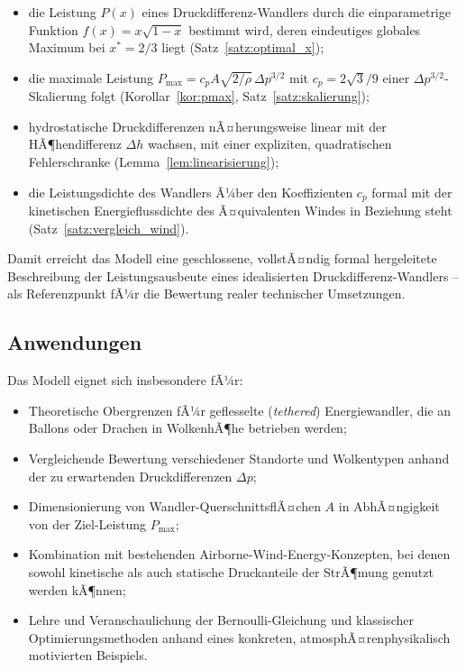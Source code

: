 ﻿\documentclass[a4paper,12pt]{article}
\theoremstyle{definition}
\begin{document}
\begin{itemize}
	\item die Leistung $P(x)$ eines Druckdifferenz-Wandlers durch die
	einparametrige Funktion $f(x) = x\sqrt{1-x}$ bestimmt wird, deren
	eindeutiges globales Maximum bei $x^\ast = 2/3$ liegt
	(Satz~\ref{satz:optimal_x});
	\item die maximale Leistung $P_{\max} = c_p A\sqrt{2/\rho}\,
	\Delta p^{3/2}$ mit $c_p = 2\sqrt{3}/9$ einer
	$\Delta p^{3/2}$-Skalierung folgt (Korollar~\ref{kor:pmax},
	Satz~\ref{satz:skalierung});
	\item hydrostatische Druckdifferenzen nÃ¤herungsweise linear mit der
	HÃ¶hendifferenz $\Delta h$ wachsen, mit einer expliziten,
	quadratischen Fehlerschranke (Lemma~\ref{lem:linearisierung});
	\item die Leistungsdichte des Wandlers Ã¼ber den Koeffizienten $c_p$
	formal mit der kinetischen Energieflussdichte des Ã¤quivalenten
	Windes in Beziehung steht (Satz~\ref{satz:vergleich_wind}).
\end{itemize}

Damit erreicht das Modell eine geschlossene, vollstÃ¤ndig formal
hergeleitete Beschreibung der Leistungsausbeute eines idealisierten
Druckdifferenz-Wandlers -- als Referenzpunkt fÃ¼r die Bewertung realer
technischer Umsetzungen.

\subsection{Anwendungen}

Das Modell eignet sich insbesondere fÃ¼r:

\begin{itemize}
	\item Theoretische Obergrenzen fÃ¼r geflesselte
	(\emph{tethered}) Energiewandler, die an Ballons oder Drachen in
	WolkenhÃ¶he betrieben werden;
	\item Vergleichende Bewertung verschiedener Standorte und
	Wolkentypen anhand der zu erwartenden Druckdifferenzen $\Delta p$;
	\item Dimensionierung von Wandler-QuerschnittsflÃ¤chen $A$ in
	AbhÃ¤ngigkeit von der Ziel-Leistung $P_{\max}$;
	\item Kombination mit bestehenden Airborne-Wind-Energy-Konzepten,
	bei denen sowohl kinetische als auch statische Druckanteile der
	StrÃ¶mung genutzt werden kÃ¶nnen;
	\item Lehre und Veranschaulichung der Bernoulli-Gleichung und
	klassischer Optimierungsmethoden anhand eines konkreten,
	atmosphÃ¤renphysikalisch motivierten Beispiels.
\end{itemize}
\end{document}
